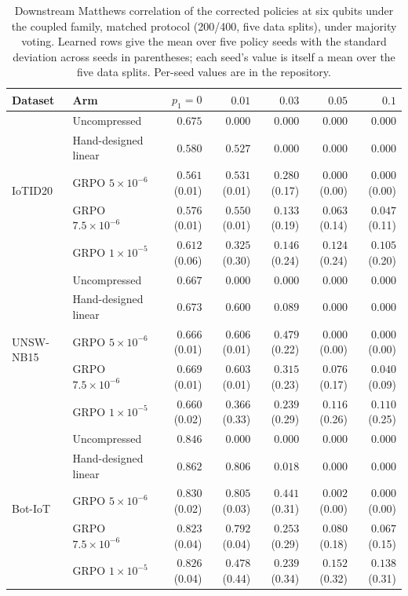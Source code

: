 \begin{table}[t]
\centering
\footnotesize
\setlength{\tabcolsep}{2.5pt}
\caption{Downstream Matthews correlation of the corrected policies at six qubits under
the coupled family, matched protocol (200/400, five data splits), under majority voting.
Learned rows give the mean over five policy seeds with the standard deviation across
seeds in parentheses; each seed's value is itself a mean over the five data splits.
Per-seed values are in the repository.}
\label{tab:compdownstream}
\begin{tabular}{@{}llrrrrr@{}}
\toprule
Dataset & Arm & $p_1 = 0$ & $0.01$ & $0.03$ & $0.05$ & $0.1$ \\
\midrule
\multirow{5}{*}{IoTID20}
 & Uncompressed & $0.675$ & $0.000$ & $0.000$ & $0.000$ & $0.000$ \\
 & Hand-designed linear & $0.580$ & $0.527$ & $0.000$ & $0.000$ & $0.000$ \\
 & GRPO $5\times10^{-6}$ & $0.561$ (0.01) & $0.531$ (0.01) & $0.280$ (0.17) & $0.000$ (0.00) & $0.000$ (0.00) \\
 & GRPO $7.5\times10^{-6}$ & $0.576$ (0.01) & $0.550$ (0.01) & $0.133$ (0.19) & $0.063$ (0.14) & $0.047$ (0.11) \\
 & GRPO $1\times10^{-5}$ & $0.612$ (0.06) & $0.325$ (0.30) & $0.146$ (0.24) & $0.124$ (0.24) & $0.105$ (0.20) \\
\midrule
\multirow{5}{*}{UNSW-NB15}
 & Uncompressed & $0.667$ & $0.000$ & $0.000$ & $0.000$ & $0.000$ \\
 & Hand-designed linear & $0.673$ & $0.600$ & $0.089$ & $0.000$ & $0.000$ \\
 & GRPO $5\times10^{-6}$ & $0.666$ (0.01) & $0.606$ (0.01) & $0.479$ (0.22) & $0.000$ (0.00) & $0.000$ (0.00) \\
 & GRPO $7.5\times10^{-6}$ & $0.669$ (0.01) & $0.603$ (0.01) & $0.315$ (0.23) & $0.076$ (0.17) & $0.040$ (0.09) \\
 & GRPO $1\times10^{-5}$ & $0.660$ (0.02) & $0.366$ (0.33) & $0.239$ (0.29) & $0.116$ (0.26) & $0.110$ (0.25) \\
\midrule
\multirow{5}{*}{Bot-IoT}
 & Uncompressed & $0.846$ & $0.000$ & $0.000$ & $0.000$ & $0.000$ \\
 & Hand-designed linear & $0.862$ & $0.806$ & $0.018$ & $0.000$ & $0.000$ \\
 & GRPO $5\times10^{-6}$ & $0.830$ (0.02) & $0.805$ (0.03) & $0.441$ (0.31) & $0.002$ (0.00) & $0.000$ (0.00) \\
 & GRPO $7.5\times10^{-6}$ & $0.823$ (0.04) & $0.792$ (0.04) & $0.253$ (0.29) & $0.080$ (0.18) & $0.067$ (0.15) \\
 & GRPO $1\times10^{-5}$ & $0.826$ (0.04) & $0.478$ (0.44) & $0.239$ (0.34) & $0.152$ (0.32) & $0.138$ (0.31) \\
\bottomrule
\end{tabular}
\end{table}

